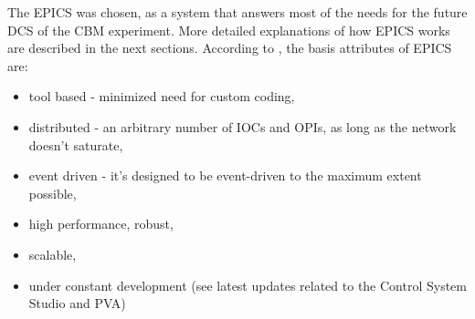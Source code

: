 The \gls{EPICS} was chosen, as a system that answers most of the needs for the future \gls{DCS} of the \gls{CBM} experiment. More detailed explanations of how \gls{EPICS} works are described in the next sections. According to \cite{EPICS_DOCS}, the basis attributes of \gls{EPICS} are:
\begin{itemize}
    \item tool based - minimized need for custom coding,
    \item distributed - an arbitrary number of \glspl{IOC} and \glspl{OPI}, as long as the network doesn't saturate,
    \item event driven - it's designed to be event-driven to the maximum extent possible,
    \item high performance, robust,
    \item scalable,
    \item under constant development (see latest updates related to the Control System Studio and PVA)
\end{itemize}

